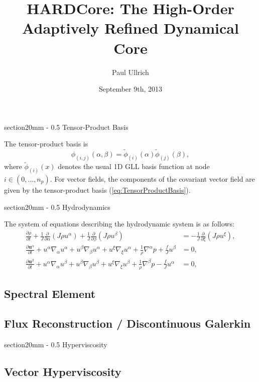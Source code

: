 \documentclass{article}
\title{\Huge \textbf{HARDCore: The High-Order Adaptively Refined Dynamical Core}}
\author{\Large Paul Ullrich}
\date{September 9th, 2013}
\makeatletter
\renewcommand\section{\@startsection
  {section}{2}{0mm}%
  {-\baselineskip}%
  {0.5\baselineskip}%
  {\normalfont\Huge\bfseries}}%
\newcommand{\vb}{\mathbf}
\newcommand{\pdiff}[2]{\frac{\partial #1}{\partial #2}}
\makeatother
\begin{document}
\section{Tensor-Product Basis}

The tensor-product basis is
\begin{equation} \label{eq:TensorProductBasis}
\phi_{(i,j)}(\alpha, \beta) = \tilde{\phi}_{(i)}(\alpha) \tilde{\phi}_{(j)}(\beta),
\end{equation} where $\tilde{\phi}_{(i)}(x)$ denotes the usual 1D GLL basis function at node $i \in (0, \ldots, n_p)$.  For vector fields, the components of the covariant vector field are given by the tensor-product basis (\ref{eq:TensorProductBasis}).

\section{Hydrodynamics}

The system of equations describing the hydrodynamic system is as follows:
\begin{align}
\pdiff{\rho}{t} + \frac{1}{J} \pdiff{}{\alpha} (J \rho u^\alpha) + \frac{1}{J} \pdiff{}{\beta} (J \rho u^\beta) &= - \frac{1}{J} \pdiff{}{\xi} (J \rho u^\xi), \\
\pdiff{\vb{u}^\alpha}{t} + u^\alpha \nabla_\alpha u^\alpha + u^\beta \nabla_\beta u^\alpha + u^\xi \nabla_\xi u^\alpha + \frac{1}{\rho} \nabla^\alpha p + \frac{f}{J} u^\beta &= 0, \\
\pdiff{\vb{u}^\beta}{t} + u^\alpha \nabla_\alpha u^\beta + u^\beta \nabla_\beta u^\beta + u^\xi \nabla_\xi u^\beta + \frac{1}{\rho} \nabla^\beta p - \frac{f}{J} u^\alpha &= 0,
\end{align}

\subsection{Spectral Element}

\subsection{Flux Reconstruction / Discontinuous Galerkin}

\section{Hyperviscosity}

\subsection{Vector Hyperviscosity}
\end{document}
